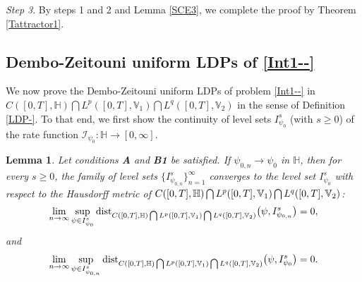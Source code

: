 \documentclass[11pt]{article}
\newcommand{\dist}{{\rm dist}}
\renewcommand{\geq}{\geqslant}  %
\newtheorem{lemma}[theorem]{Lemma}
\numberwithin{equation}{section}
\begin{document}
\emph{Step 3}. By steps 1 and 2 and Lemma \ref{SCE3}, we complete the proof by Theorem \ref{Tattractor1}.


\subsection{Dembo-Zeitouni  uniform LDPs of \eqref{Int1--}}

We now prove the Dembo-Zeitouni uniform
LDPs of problem \eqref{Int1--} in
$C([0,T],\mathbb{H} )\bigcap L^p([0,T], \mathbb{V}_1  )\bigcap L^q([0,T], \mathbb{V}_2)$
in the sense of Definition \ref{LDP-}. To that end, we first show the continuity of level sets
$I^s_{\psi_0}$ (with $s\geq0$)
of the rate function $\mathcal{I}_{\psi_0}:\mathbb{H}
\rightarrow[0,\infty]$.

\begin{lemma}\label{continuityoflevelsets}
Let conditions  {\bf A} and {\bf B1}
be satisfied. If $\psi_{0,n}\rightarrow\psi_{0}$
in $\mathbb{H}$, then for every $s\geq0$, the family of level sets $\{I^s_{\psi_{0,n}}\}_{n=1}^\infty$
converges to the level set $I^s_{\psi_{0}}$ with respect to the Hausdorff metric of $C([0,T],\mathbb{H} )\bigcap L^p([0,T], \mathbb{V}_1  )\\ \bigcap L^q([0,T], \mathbb{V}_2)$:
\begin{align}
\label{main4}\lim_{n\rightarrow\infty}
\sup_{\psi\in I^s_{\psi_{0}}}\dist_{C([0,T],\mathbb{H} )\bigcap L^p([0,T], \mathbb{V}_1  )\bigcap L^q([0,T], \mathbb{V}_2)}\big(\psi,I^s_{\psi_{0,n}}\big)=0,
\end{align}
and
\begin{align}
\label{main5}\lim_{n\rightarrow\infty}
\sup_{\psi\in I_{\psi_{0,n}}^s}\dist_{C([0,T],\mathbb{H} )\bigcap L^p([0,T], \mathbb{V}_1  )\bigcap L^q([0,T], \mathbb{V}_2)}\big(\psi,I^s_{\psi_{0}}\big)=0.
\end{align}
\end{lemma}
\end{document}
